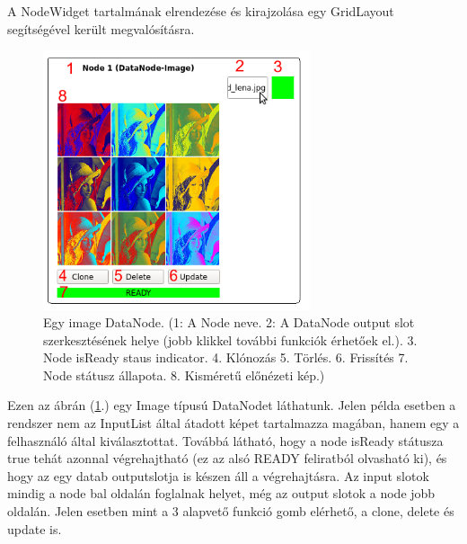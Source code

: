 \documentclass[a4paper,12pt,oneside]{report}
\begin{document}
A NodeWidget tartalmának elrendezése és kirajzolása egy GridLayout segítségével került megvalósításra.
\begin{center}
\begin{figure}[h]
  \includegraphics[width=0.7\textwidth]{datanode_full.png}
  \caption{Egy image DataNode. (1: A Node neve. 2: A DataNode output slot szerkesztésének helye (jobb klikkel további funkciók érhetőek el.). 3. Node isReady staus indicator. 4. Klónozás 5. Törlés. 6. Frissítés 7. Node státusz állapota. 8. Kisméretű előnézeti kép.)}
  \label{fig:datanode_full}
\end{figure}
\end{center}
Ezen az ábrán (\ref{fig:datanode_full}.) egy Image típusú DataNodet láthatunk. Jelen példa esetben a rendszer nem az InputList által átadott képet tartalmazza magában, hanem egy a felhasználó által kiválasztottat. Továbbá látható, hogy a node isReady státusza true tehát azonnal végrehajtható (ez az alsó READY feliratból olvasható ki), és hogy az egy datab outputslotja is készen áll a végrehajtásra. Az input slotok mindig a node bal oldalán foglalnak helyet, még az output slotok a node jobb oldalán. Jelen esetben mint a 3 alapvető funkció gomb elérhető, a clone, delete és update is.
\end{document}
